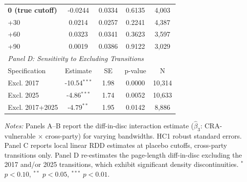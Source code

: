 \begin{table}[H]
\begin{threeparttable}
\begin{tabular}{lcccc}
\textbf{0 (true cutoff)} & -0.0244 & 0.0334 & 0.6135 & 4,003 \\
+30 & 0.0214 & 0.0257 & 0.2241 & 4,387 \\
+60 & 0.0323 & 0.0341 & 0.3623 & 3,597 \\
+90 & 0.0019 & 0.0386 & 0.9122 & 3,029 \\
\midrule
\multicolumn{5}{l}{\textit{Panel D: Sensitivity to Excluding Transitions}} \\
\midrule
Specification & Estimate & SE & p-value & N \\
\midrule
Excl. 2017 & -10.54$^{***}$ & 1.98 & 0.0000 & 10,314 \\
Excl. 2025 & -4.86$^{***}$ & 1.74 & 0.0052 & 10,633 \\
Excl. 2017+2025 & -4.79$^{**}$ & 1.95 & 0.0142 & 8,886 \\
\bottomrule
\end{tabular}
\begin{tablenotes}[flushleft]
\footnotesize
\item \textit{Notes:} Panels A--B report the diff-in-disc interaction estimate ($\hat{\beta}_3$: CRA-vulnerable $\times$ cross-party) for varying bandwidths. HC1 robust standard errors. Panel C reports local linear RDD estimates at placebo cutoffs, cross-party transitions only. Panel D re-estimates the page-length diff-in-disc excluding the 2017 and/or 2025 transitions, which exhibit significant density discontinuities. $^{*}$ $p<0.10$, $^{**}$ $p<0.05$, $^{***}$ $p<0.01$.
\end{tablenotes}
\end{threeparttable}
\end{table}
